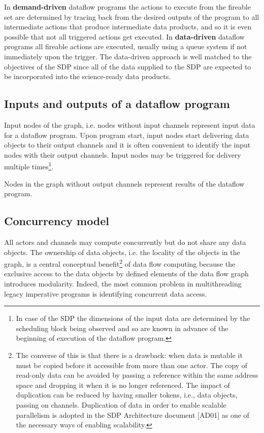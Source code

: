 \documentclass[11pt,a4paper]{article}
\begin{document}
In {\bf demand-driven} dataflow programs the actions to execute from
the fireable set are determined by tracing back from the desired
outputs of the program to all intermediate actions that produce
intermediate data products, and so it is even possible that not all
triggered actions get executed. In {\bf data-driven} dataflow programs
all fireable actions are executed, usually using a queue system if not
immediately upon the trigger. The data-driven approach is well matched
to the objectives of the SDP since all of the data supplied to the SDP
are expected to be incorporated into the science-ready data products.


\subsection{Inputs and outputs of a dataflow program}

Input nodes of the graph, i.e. nodes without input channels represent
input data for a dataflow program.  Upon program start, input nodes
start delivering data objects to their output channels and it is often
convenient to identify the input nodes with their output
channels. Input nodes may be triggered for delivery multiple
times\footnote{In case of the SDP the dimensions of the input data are
  determined by the scheduling block being observed and so are known
  in advance of the beginning of execution of the dataflow program.}.

Nodes in the graph without output channels represent results of the dataflow program.

\subsection{Concurrency model}
 
All actors and channels may compute concurrently but do not share any
data objects. The ownership of data objects, i.e. the locality of the
objects in the graph, is a central conceptual benefit\footnote{The
  converse of this is that there is a drawback: when data is mutable
  it must be copied before it accessible from more than one actor. The
  copy of read-only data can be avoided by passing a reference within
  the same address space and dropping it when it is no longer
  referenced.  The impact of duplication can be reduced by having
  smaller tokens, i.e., data objects, passing on channels. Duplication
  of data in order to enable scalable parallelism is adopted in the
  SDP Architecture document [AD01] as one of the necessary ways of
  enabling scalability.} of data flow computing because the exclusive
access to the data objects by defined elements of the data flow graph
introduces modularity. Indeed, the most common problem in
multithreading legacy imperative programs is identifying concurrent
data access.
\end{document}
